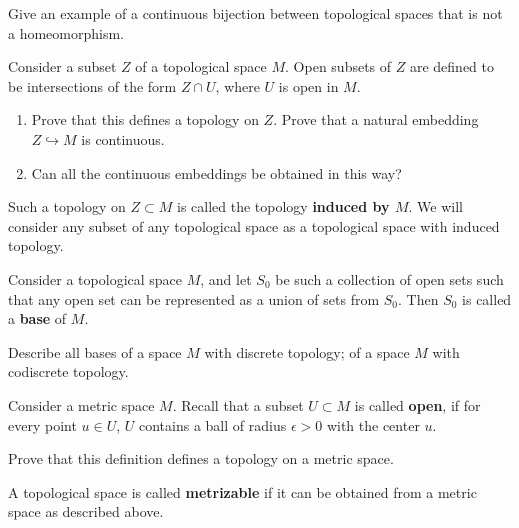 \documentclass[12pt]{article}
\begin{document}
\begin{zadacha}
  Give an example of a continuous 
bijection between topological spaces that is not
  a homeomorphism.
\end{zadacha}

\begin{zadacha} 
  Consider a subset $Z$ of a topological space $M$.  Open subsets of
  $Z$ are defined to be intersections of the form $Z\cap U$, where $U$  
  is open in $M$.
\begin{enumerate}
\item Prove that this defines a topology on $Z$. Prove that a natural
  embedding $Z\hookrightarrow M$ is continuous.

\item\sttr{} Can all the continuous embeddings be obtained in this
  way?
\end{enumerate}
\end{zadacha}

\begin{opredelenie}
  Such a topology on $Z\subset M$ is called the topology {\bf induced
    by $M$}.  We will consider any subset of any topological space as
  a topological space with induced topology.
\end{opredelenie}

\begin{opredelenie}
Consider a topological space $M$, and let $S_0$ be such a collection
of open sets such that any open set can be represented as a union of
sets from $S_0$. Then $S_0$ is called a {\bf base} of
$M$.
\end{opredelenie}

\begin{zadacha}
  Describe all bases of a space $M$ with discrete topology; of a space
  $M$ with codiscrete topology.
\end{zadacha}

\begin{opredelenie}
Consider a metric space $M$.  Recall that a subset
$U\subset M$ is called {\bf open}, if for every point $u\in
U$, $U$ contains a ball of radius $\epsilon >0$ with the center $u$.   
\end{opredelenie}

\begin{zadacha} 
Prove that this definition defines a topology on a metric space.
\end{zadacha}

\begin{opredelenie}
A topological space is called {\bf metrizable} if it can be
obtained from a metric space as described above.
\end{opredelenie}
\end{document}
